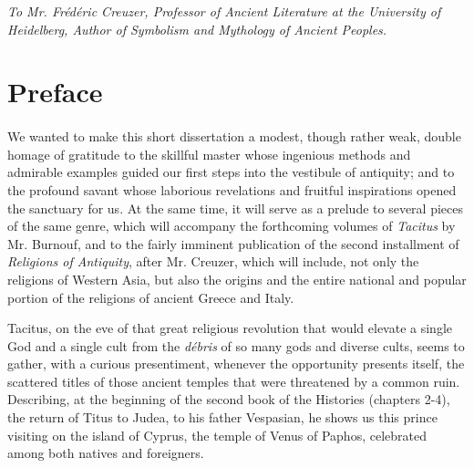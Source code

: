 \documentclass[a4paper, 11pt, oneside, polutonikogreek, english]{article}
\begin{document}
\setlength{\parskip}{1mm plus1mm minus1mm}
\clearpage
\tableofcontents
\clearpage
\vspace*{\fill}
\begin{center}
\emph{To Mr. Frédéric Creuzer, Professor of Ancient Literature at the University of Heidelberg, Author of Symbolism and Mythology of Ancient Peoples.}
\end{center}
\vspace*{\fill}
\clearpage
\section*{Preface}
\paragraph{}
We wanted to make this short dissertation a modest, though rather weak, double homage of gratitude to the skillful master whose ingenious methods and admirable examples guided our first steps into the vestibule of antiquity; and to the profound savant whose laborious revelations and fruitful inspirations opened the sanctuary for us. At the same time, it will serve as a prelude to several pieces of the same genre, which will accompany the forthcoming volumes of \emph{Tacitus} by Mr. Burnouf, and to the fairly imminent publication of the second installment of \emph{Religions of Antiquity}, after Mr. Creuzer, which will include, not only the religions of Western Asia, but also the origins and the entire national and popular portion of the religions of ancient Greece and Italy.

Tacitus, on the eve of that great religious revolution that would elevate a single God and a single cult from the \emph{débris} of so many gods and diverse cults, seems to gather, with a curious presentiment, whenever the opportunity presents itself, the scattered titles of those ancient temples that were threatened by a common ruin. Describing, at the beginning of the second book of the Histories (chapters 2-4), the return of Titus to Judea, to his father Vespasian, he shows us this prince visiting on the island of Cyprus, the temple of Venus of Paphos, celebrated among both natives and foreigners.
\end{document}
